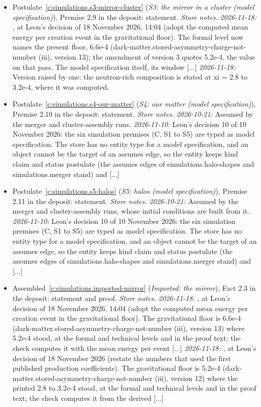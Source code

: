 \documentclass[11pt]{article}
\theoremstyle{definition}
\theoremstyle{plain}
\begin{document}
\begin{itemize}
\item Postulate~\ref{c:simulations.s3-mirror-cluster} (\emph{S3: the mirror in a cluster (model specification)}), Premise 2.9 in the deposit: statement. \emph{Store notes.} \emph{2026-11-18:} , at Leon's decision of 18 November 2026, 14:04 (adopt the computed mean energy per creation event in the gravitational floor). The formal level now names the present floor, 6.6e-4 (dark-matter.stored-asymmetry-charge-not-number (iii), version 13); the amendment of version 3 quotes 5.2e-4, the value on that pass. The model specification itself, its window [...] \emph{2026-11-18:} Version raised by one: the neutron-rich composition is stated at xi = 2.8 to 3.2e-4, where it was computed.
\item Postulate~\ref{c:simulations.s4-our-matter} (\emph{S4: our matter (model specification)}), Premise 2.10 in the deposit: statement. \emph{Store notes.} \emph{2026-10-21:} Assumed by the merger and cluster-assembly runs. \emph{2026-11-10:} Leon's decision 10 of 10 November 2026: the six simulation premises (C, S1 to S5) are typed as model specification. The store has no entity type for a model specification, and an object cannot be the target of an assumes edge, so the entity keeps kind claim and status postulate (the assumes edges of simulations.halo-shapes and simulations.merger stand) and [...]
\item Postulate~\ref{c:simulations.s5-halos} (\emph{S5: halos (model specification)}), Premise 2.11 in the deposit: statement. \emph{Store notes.} \emph{2026-10-21:} Assumed by the merger and cluster-assembly runs, whose initial conditions are built from it. \emph{2026-11-10:} Leon's decision 10 of 10 November 2026: the six simulation premises (C, S1 to S5) are typed as model specification. The store has no entity type for a model specification, and an object cannot be the target of an assumes edge, so the entity keeps kind claim and status postulate (the assumes edges of simulations.halo-shapes and simulations.merger stand) and [...]
\item Assembled~\ref{c:simulations.imported-mirror} (\emph{Imported: the mirror}), Fact 2.3 in the deposit: statement and proof. \emph{Store notes.} \emph{2026-11-18:} , at Leon's decision of 18 November 2026, 14:04 (adopt the computed mean energy per creation event in the gravitational floor). The gravitational floor is 6.6e-4 (dark-matter.stored-asymmetry-charge-not-number (iii), version 13) where 5.2e-4 stood, at the formal and technical levels and in the proof text; the check computes it with the mean energy per event [...] \emph{2026-11-18:} , at Leon's decision of 18 November 2026 (restate the numbers that used the first published production coefficients). The gravitational floor is 5.2e-4 (dark-matter.stored-asymmetry-charge-not-number (iii), version 12) where the printed 2.8 to 3.2e-4 stood, at the formal and technical levels and in the proof text; the check computes it from the derived [...]

\end{itemize}
\end{document}
